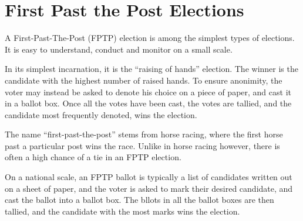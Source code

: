 \section*{First Past the Post Elections}

A First-Past-The-Post (FPTP) election is among the simplest types of elections.
It is easy to understand, conduct and monitor on a small scale.

In its simplest incarnation, it is the ``raising of hands'' election. The
winner is the candidate with the highest number of raised hands. To ensure
anonimity, the voter may instead be asked to denote his choice on a piece of
paper, and cast it in a ballot box. Once all the votes have been cast, the
votes are tallied, and the candidate most frequently denoted, wins the
election.

The name ``first-past-the-post'' stems from horse racing, where the first horse
past a particular post wins the race. Unlike in horse racing however, there is
often a high chance of a tie in an FPTP election.

On a national scale, an FPTP ballot is typically a list of candidates written
out on a sheet of paper, and the voter is asked to mark their desired
candidate, and cast the ballot into a ballot box. The bllots in all the ballot
boxes are then tallied, and the candidate with the most marks wins the
election.

